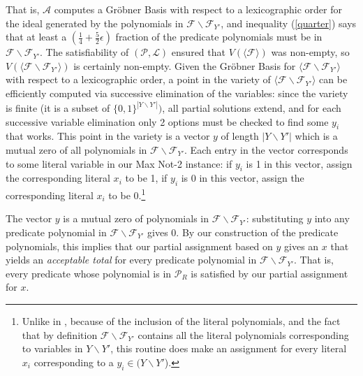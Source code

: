 \documentclass{article}
\begin{document}
That is, $\mathcal{A}$ computes a Gr\"{o}bner Basis with respect to a lexicographic order for the ideal generated by the polynomials in $\mathcal{F}\backslash \mathcal{F}_{Y'}$, and inequality (\ref{quarter}) says that at least a $(\frac{1}{4}+\frac{5}{2}\epsilon)$ fraction of the predicate polynomials must be in $\mathcal{F}\backslash \mathcal{F}_{Y'}$. The satisfiability of $(\mathcal{P}, \mathcal{L})$ ensured that $V(\langle \mathcal{F}\rangle)$ was non-empty, so $V(\langle \mathcal{F}\backslash \mathcal{F}_{Y'}\rangle)$ is certainly non-empty.
Given the Gr\"{o}bner Basis for $\langle\mathcal{F}\backslash \mathcal{F}_{Y'}\rangle$ with respect to a lexicographic order, a point in the variety of $\langle\mathcal{F}\backslash \mathcal{F}_{Y'}\rangle$ can be efficiently computed via successive elimination of the variables: since the variety is finite (it is a subset of $\{0,1\}^{|Y\backslash Y'|})$, all partial solutions extend, and for each successive variable elimination only 2 options must be checked to find some $y_i$ that works. This point in the variety is a vector $y$ of length $|Y\backslash Y'|$ which is a mutual zero of all polynomials in $\mathcal{F}\backslash \mathcal{F}_{Y'}$. Each entry in the vector corresponds to some literal variable in our Max Not-2 instance: if $y_i$ is 1 in this vector, assign the corresponding literal $x_i$ to be 1, if $y_i$ is 0 in this vector, assign the corresponding literal $x_i$ to be 0.\footnote{Unlike in \citep{RS}, because of the inclusion of the literal polynomials, and the fact that by definition $\mathcal{F}\backslash \mathcal{F}_{Y'}$ contains all the literal polynomials corresponding to variables in $Y\backslash Y'$, this routine does make an assignment for every literal $x_i$ corresponding to a  $y_i \in (Y\backslash Y'$).} 

The vector $y$ is a mutual zero of polynomials in $\mathcal{F}\backslash \mathcal{F}_{Y'}$: substituting $y$ into any predicate polynomial
in $\mathcal{F}\backslash \mathcal{F}_{Y'}$ gives 0. By our construction of the predicate polynomials, this implies that our partial assignment based on $y$ gives an $x$ that yields an \textit{acceptable total} for every predicate polynomial in $\mathcal{F}\backslash \mathcal{F}_{Y'}$. That is, every predicate whose polynomial is in $\mathcal{P}_R$ is satisfied by our partial assignment for $x$.\\
\end{document}
